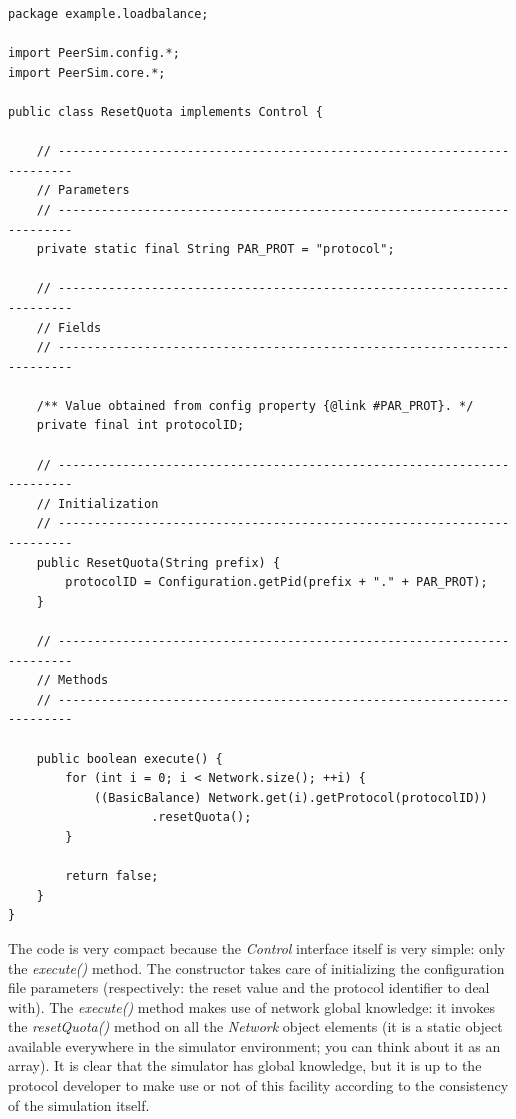 \documentclass[a4paper,11pt]{article}
\begin{document}
\footnotesize
\begin{verbatim}
package example.loadbalance;

import PeerSim.config.*;
import PeerSim.core.*;

public class ResetQuota implements Control {

    // ------------------------------------------------------------------------
    // Parameters
    // ------------------------------------------------------------------------
    private static final String PAR_PROT = "protocol";

    // ------------------------------------------------------------------------
    // Fields
    // ------------------------------------------------------------------------

    /** Value obtained from config property {@link #PAR_PROT}. */
    private final int protocolID;

    // ------------------------------------------------------------------------
    // Initialization
    // ------------------------------------------------------------------------
    public ResetQuota(String prefix) {
        protocolID = Configuration.getPid(prefix + "." + PAR_PROT);
    }

    // ------------------------------------------------------------------------
    // Methods
    // ------------------------------------------------------------------------

    public boolean execute() {
        for (int i = 0; i < Network.size(); ++i) {
            ((BasicBalance) Network.get(i).getProtocol(protocolID))
                    .resetQuota();
        }

        return false;
    }
}
\end{verbatim}
\normalsize

The code is very compact because the \emph{Control} interface itself
is very simple: only the \emph{execute()} method. The constructor takes
care of initializing the configuration file parameters (respectively:
the reset value and the protocol identifier to deal with). The \emph{execute()}
method makes use of network global knowledge: it invokes the \emph{resetQuota()}
method on all the \emph{Network} object elements (it is a static
object available everywhere in the simulator environment; you can think
about it as an array). It is clear that the simulator has global knowledge,
but it is up to the protocol developer to make use or not of this
facility according to the consistency of the simulation itself. 
\end{document}
